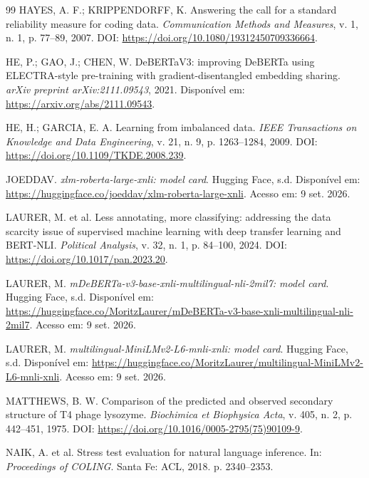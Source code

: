 \begin{thebibliography}{99}
HAYES, A. F.; KRIPPENDORFF, K. Answering the call for a standard reliability measure for coding data. \emph{Communication Methods and Measures}, v. 1, n. 1, p. 77--89, 2007. DOI: \url{https://doi.org/10.1080/19312450709336664}.

HE, P.; GAO, J.; CHEN, W. DeBERTaV3: improving DeBERTa using ELECTRA-style pre-training with gradient-disentangled embedding sharing. \emph{arXiv preprint arXiv:2111.09543}, 2021. Disponível em: \url{https://arxiv.org/abs/2111.09543}.

HE, H.; GARCIA, E. A. Learning from imbalanced data. \emph{IEEE Transactions on Knowledge and Data Engineering}, v. 21, n. 9, p. 1263--1284, 2009. DOI: \url{https://doi.org/10.1109/TKDE.2008.239}.

JOEDDAV. \emph{xlm-roberta-large-xnli: model card}. Hugging Face, s.d. Disponível em: \url{https://huggingface.co/joeddav/xlm-roberta-large-xnli}. Acesso em: 9 set. 2026.

LAURER, M. et al. Less annotating, more classifying: addressing the data scarcity issue of supervised machine learning with deep transfer learning and BERT-NLI. \emph{Political Analysis}, v. 32, n. 1, p. 84--100, 2024. DOI: \url{https://doi.org/10.1017/pan.2023.20}.

LAURER, M. \emph{mDeBERTa-v3-base-xnli-multilingual-nli-2mil7: model card}. Hugging Face, s.d. Disponível em: \url{https://huggingface.co/MoritzLaurer/mDeBERTa-v3-base-xnli-multilingual-nli-2mil7}. Acesso em: 9 set. 2026.

LAURER, M. \emph{multilingual-MiniLMv2-L6-mnli-xnli: model card}. Hugging Face, s.d. Disponível em: \url{https://huggingface.co/MoritzLaurer/multilingual-MiniLMv2-L6-mnli-xnli}. Acesso em: 9 set. 2026.

MATTHEWS, B. W. Comparison of the predicted and observed secondary structure of T4 phage lysozyme. \emph{Biochimica et Biophysica Acta}, v. 405, n. 2, p. 442--451, 1975. DOI: \url{https://doi.org/10.1016/0005-2795(75)90109-9}.

NAIK, A. et al. Stress test evaluation for natural language inference. In: \emph{Proceedings of COLING}. Santa Fe: ACL, 2018. p. 2340--2353.


\end{thebibliography}
